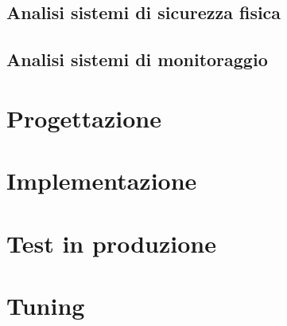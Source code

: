 \documentclass[Tesi.tex]{subfiles}
\begin{document}
\subsection{Analisi sistemi di sicurezza fisica}

\subsection{Analisi sistemi di monitoraggio}



\section{Progettazione}

\section{Implementazione}

\section{Test in produzione}

\section{Tuning}
\end{document}
